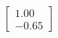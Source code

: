 \documentclass[preview]{standalone}
\begin{document}
\begin{align*}
\begin{bmatrix} 1.00 \\ -0.65 \end{bmatrix}
\end{align*}
\end{document}
